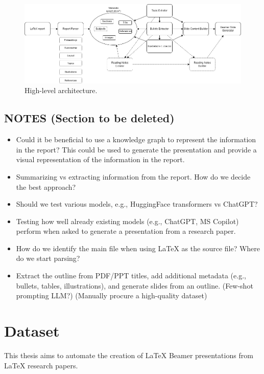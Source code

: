 \begin{figure}
    \centering
    \includegraphics[width=1\linewidth]{images/High-Level Architecture Diagram.png}
    \caption{High-level architecture.}
    \label{fig:high-level-architecture}
\end{figure}

%
\subsection{NOTES (Section to be deleted)}
\begin{itemize}
    \item Could it be beneficial to use a knowledge graph to represent the information in the report? This could be used to generate the presentation and provide a visual representation of the information in the report.
    \item Summarizing vs extracting information from the report. How do we decide the best approach?
    \item Should we test various models, e.g., HuggingFace transformers vs ChatGPT?
    \item Testing how well already existing models (e.g., ChatGPT, MS Copilot) perform when asked to generate a presentation from a research paper.
    \item How do we identify the main file when using LaTeX as the source file? Where do we start parsing? 
    \item Extract the outline from PDF/PPT titles, add additional metadata (e.g., bullets, tables, illustrations), and generate slides from an outline. (Few-shot prompting LLM?) (Manually procure a high-quality dataset)
\end{itemize}

\section{Dataset}
This thesis aims to automate the creation of LaTeX Beamer presentations from LaTeX research papers.

